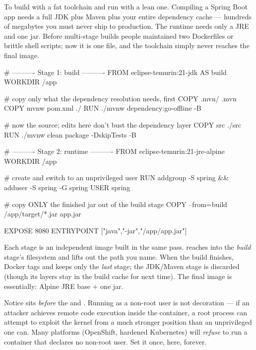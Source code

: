  To build with a fat toolchain and run with a lean one. Compiling a Spring Boot app needs a full JDK plus Maven plus your entire dependency cache --- hundreds of megabytes you must never ship to production. The runtime needs only a JRE and one jar. Before multi-stage builds people maintained two Dockerfiles or brittle shell scripts; now it is one file, and the toolchain simply never reaches the final image.

\begin{dockerbox}
# ---------- Stage 1: build ----------
FROM eclipse-temurin:21-jdk AS build
WORKDIR /app

# copy only what the dependency resolution needs, first
COPY .mvn/ .mvn
COPY mvnw pom.xml ./
RUN ./mvnw dependency:go-offline -B

# now the source; edits here don't bust the dependency layer
COPY src ./src
RUN ./mvnw clean package -DskipTests -B

# ---------- Stage 2: runtime ----------
FROM eclipse-temurin:21-jre-alpine
WORKDIR /app

# create and switch to an unprivileged user
RUN addgroup -S spring && adduser -S spring -G spring
USER spring

# copy ONLY the finished jar out of the build stage
COPY --from=build /app/target/*.jar app.jar

EXPOSE 8080
ENTRYPOINT ["java","-jar","/app/app.jar"]
\end{dockerbox}

 Each stage is an independent image built in the same pass.  reaches into the \emph{build} stage's filesystem and lifts out the path you name. When the build finishes, Docker tags and keeps only the \emph{last} stage; the JDK/Maven stage is discarded (though its layers stay in the build cache for next time). The final image is essentially: Alpine JRE base $+$ one jar.

\begin{seniornote}
Notice  sits \emph{before} the  and . Running as a non-root user is not decoration --- if an attacker achieves remote code execution inside the container, a root process can attempt to exploit the kernel from a much stronger position than an unprivileged one can. Many platforms (OpenShift, hardened Kubernetes) will \emph{refuse} to run a container that declares no non-root user. Set it once, here, forever.
\end{seniornote}


